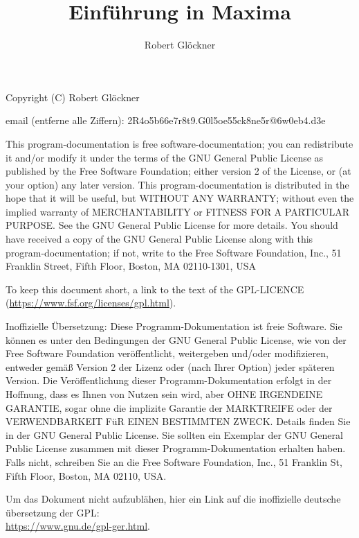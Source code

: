 \documentclass[12pt]{scrartcl}
\title{Einführung in Maxima}
\author{Robert Glöckner}
\begin{document}
\maketitle

\tableofcontents

\newpage
\thispagestyle{empty}
Copyright (C) Robert Glöckner

email (entferne alle Ziffern): 2R4o5b66e7r8t9.G0l5oe55ck8ne5r@6w0eb4.d3e

\vspace{1cm}

{\scriptsize
This program-documentation is free software-documentation; you can redistribute it and/or modify it under the terms of the GNU General Public License as published by the Free Software Foundation; either version 2 of the License, or (at your option) any later version.
This program-documentation is distributed in the hope that it will be useful, but WITHOUT ANY WARRANTY; without even the implied warranty of MERCHANTABILITY or FITNESS FOR A PARTICULAR PURPOSE\@. See the GNU General Public License for more details.
You should have received a copy of the GNU General Public License along with this program-documentation; if not, write to the Free Software Foundation, Inc., 51 Franklin Street, Fifth Floor, Boston, MA  02110-1301, USA

To keep this document short, a link to the text of the GPL-LICENCE (\url{https://www.fsf.org/licenses/gpl.html}).

\vspace{1cm}

Inoffizielle Übersetzung: Diese Programm-Dokumentation ist freie Software. Sie können es unter den Bedingungen der GNU General Public License, wie von der Free Software Foundation veröffentlicht, weitergeben und/oder modifizieren, entweder gemäß Version 2 der Lizenz oder (nach Ihrer Option) jeder späteren Version.
Die Veröffentlichung dieser Programm-Dokumentation erfolgt in der Hoffnung, dass es Ihnen von Nutzen sein wird, aber OHNE IRGENDEINE GARANTIE, sogar ohne die implizite Garantie der MARKTREIFE oder der VERWENDBARKEIT FüR EINEN BESTIMMTEN ZWECK\@. Details finden Sie in der GNU General Public License.
Sie sollten ein Exemplar der GNU General Public License zusammen mit dieser Programm-Dokumentation erhalten haben. Falls nicht, schreiben Sie an die Free Software Foundation, Inc., 51 Franklin St, Fifth Floor, Boston, MA 02110, USA.

Um das Dokument nicht aufzublähen, hier ein Link auf die inoffizielle
deutsche übersetzung der GPL:\\
\url{https://www.gnu.de/gpl-ger.html}.
}
\end{document}
